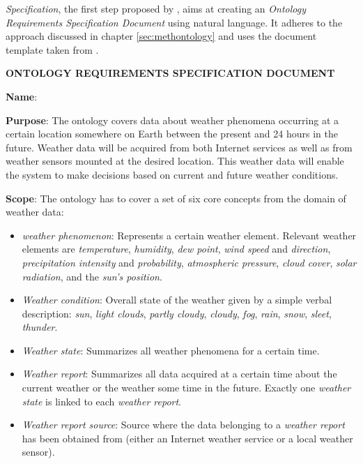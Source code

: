 \emph{Specification}, the first step proposed by \methontology, aims at creating an \emph{Ontology Requirements Specification Document} using natural language. It adheres to the approach discussed in chapter \ref{sec:methontology} and uses the document template taken from \cite{ORSD}.

\vspace{1em}

\begin{mdframed}[linewidth=.6pt]
\setlength{\parindent}{0pt}
\vspace{.3cm}

\MakeUppercase{\textbf{Ontology Requirements Specification Document}}

\vspace{.5cm}

\textbf{Name}: \thinkhomeweather

\vspace{.2cm}

\textbf{Purpose}: The ontology covers data about weather phenomena occurring at a certain location somewhere on Earth between the present and 24 hours in the future. Weather data will be acquired from both Internet services as well as from weather sensors mounted at the desired location. This weather data will enable the \thinkhome system to make decisions based on current and future weather conditions.

\vspace{.2cm}

\textbf{Scope}: The ontology has to cover a set of six core concepts from the domain of weather data:

\begin{itemize}
  \item \emph{weather phenomenon}: Represents a certain weather element. Relevant weather elements are \emph{temperature}, \emph{humidity}, \emph{dew point}, \emph{wind speed} and \emph{direction}, \emph{precipitation intensity} and \emph{probability}, \emph{atmospheric pressure}, \emph{cloud cover}, \emph{solar radiation}, and the \emph{sun's position}.
  \item \emph{Weather condition}: Overall state of the weather given by a simple verbal description: \emph{sun}, \emph{light clouds}, \emph{partly cloudy}, \emph{cloudy}, \emph{fog}, \emph{rain}, \emph{snow}, \emph{sleet}, \emph{thunder}.
  \item \emph{Weather state}: Summarizes all weather phenomena for a certain time. 
  \item \emph{Weather report}: Summarizes all data acquired at a certain time about the current weather or the weather some time in the future. Exactly one \emph{weather state} is linked to each \emph{weather report}.
  \item \emph{Weather report source}: Source where the data belonging to a \emph{weather report} has been obtained from (either an Internet weather service or a local weather sensor).
\end{itemize}


\end{mdframed}
